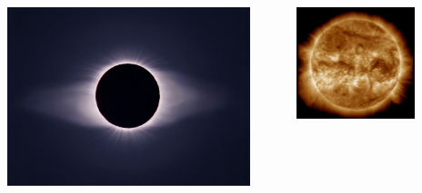 \documentclass{beamer}
\begin{document}
{{\begin{columns}
\begin{center}
\includegraphics[width=0.9\textwidth]{figuras/streamer_minimo_solar.jpg}
\mediosalto
\end{center}
\centering
\includegraphics[width=0.7\textwidth]{figuras/aia_charla.png}
\end{columns}
}
}
\end{document}
